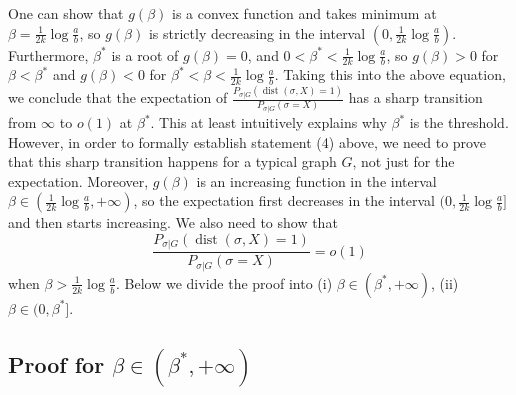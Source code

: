 \label{key}\documentclass[conference]{IEEEtran}
\DeclareMathOperator{\dist}{dist}
\begin{document}
One can show that $g(\beta)$ is a convex function and takes minimum at $\beta=\frac{1}{2k}\log\frac{a}{b}$, so $g(\beta)$ is strictly decreasing in the interval $(0,\frac{1}{2k}\log\frac{a}{b})$. Furthermore, $\beta^\ast$ is a root of $g(\beta)=0$, and $0<\beta^\ast<\frac{1}{2k}\log\frac{a}{b}$, so $g(\beta)>0$ for $\beta<\beta^\ast$ and $g(\beta)<0$ for $\beta^\ast<\beta<\frac{1}{2k}\log\frac{a}{b}$.
Taking this into the above equation, we conclude that the expectation of $\frac{P_{\sigma|G} ( \dist(\sigma, X) = 1 )}{P_{\sigma|G}(\sigma= X)}$ has a sharp transition from $\infty$ to $o(1)$ at $\beta^\ast$.
This at least intuitively explains why $\beta^\ast$ is the threshold. However, in order to formally establish statement (4) above, we need to prove that this sharp transition happens for a typical graph $G$, not just for the expectation.
Moreover, $g(\beta)$ is an increasing function in the interval $\beta\in(\frac{1}{2k}\log\frac{a}{b}, +\infty)$, so the expectation first decreases in the interval $(0,\frac{1}{2k}\log\frac{a}{b}]$ and then starts increasing. We also need to show that
$$
\frac{P_{\sigma|G} ( \dist(\sigma, X) = 1 )}{P_{\sigma|G}(\sigma= X)} 
= o(1)
$$
when $\beta>\frac{1}{2k}\log\frac{a}{b}$.
Below we divide the proof into (i) $\beta\in(\beta^\ast,+\infty)$, (ii) $\beta\in(0,\beta^\ast]$.

\subsection{Proof for $\beta\in(\beta^*,+\infty)$}
\end{document}
